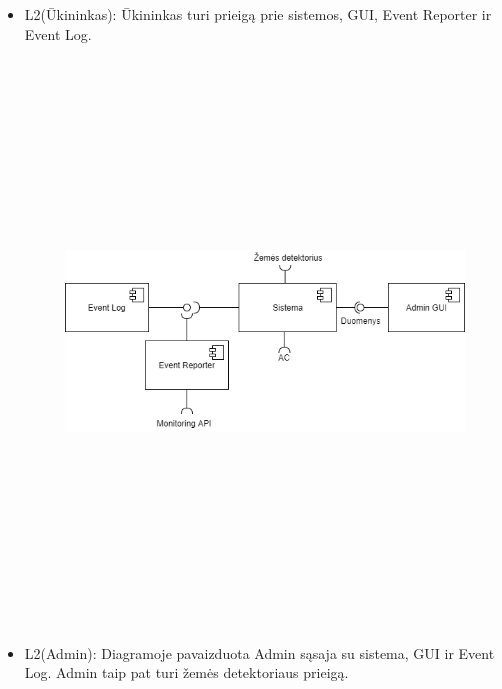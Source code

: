 \documentclass[oneside]{VUMIFPSkursinis}
\begin{document}
\begin{itemize}
\begin{figure}[H]
	\caption{}
	\label{fig:}
\end{figure}
\item L2(Ūkininkas): Ūkininkas turi prieigą prie sistemos, GUI, Event Reporter ir Event Log.
\begin{figure}[H]
		\centering	
	\includegraphics[width=15cm,height=15cm,keepaspectratio]{2L2Admin.png}
	\caption{}
	\label{fig:}
\end{figure}
\item L2(Admin): Diagramoje pavaizduota Admin sąsaja su sistema, GUI ir Event Log. Admin taip pat turi žemės detektoriaus prieigą.
\begin{figure}[H]
		\centering	

\end{figure}
\end{itemize}
\end{document}
